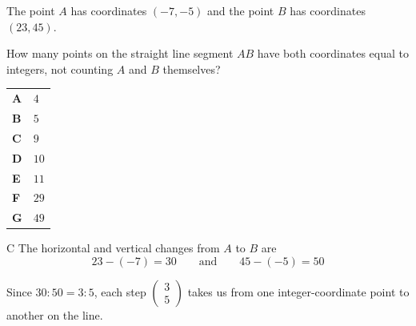 \documentclass[11pt,a4paper]{article}
\begin{document}
\begin{enumerate}[label=\textbf{\arabic*.},leftmargin=*,itemsep=0pt,start=18]
The point $A$ has coordinates $(-7,-5)$ and the point $B$ has coordinates $(23,45)$.

How many points on the straight line segment $AB$ have both coordinates equal to integers, not counting $A$ and $B$ themselves?

\par\vspace*{12pt}
\begin{tabularx}{\linewidth}{@{}>{\bfseries}l Y@{}}
A &
$4$
\\[0.8em]
B &
$5$
\\[0.8em]
C &
$9$
\\[0.8em]
D &
$10$
\\[0.8em]
E &
$11$
\\[0.8em]
F &
$29$
\\[0.8em]
G &
$49$
\\
\end{tabularx}

\begin{djsSolution}{C}
The horizontal and vertical changes from $A$ to $B$ are
\[
23-(-7)=30
\qquad\text{and}\qquad
45-(-5)=50
\]

\begin{djsSolutionFigure}
\end{djsSolutionFigure}

Since $30:50=3:5$, each step $\begin{pmatrix}3\\5\end{pmatrix}$ takes us from one integer-coordinate point to another on the line.


\end{djsSolution}
\end{enumerate}
\end{document}
